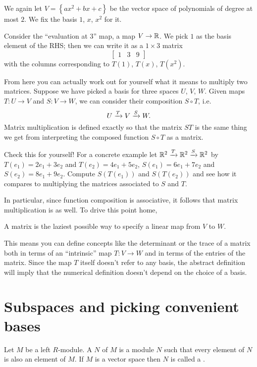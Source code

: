 \begin{example}
	We again let $V = \left\{ ax^2 + bx + c \right\}$
	be the vector space of polynomials of degree at most $2$.
	We fix the basis $1$, $x$, $x^2$ for it.

	Consider the ``evaluation at $3$'' map,
	a map $V \to \mathbb R$.
	We pick $1$ as the basis element of the RHS;
	then we can write it as a $1 \times 3$ matrix
	\[ \begin{bmatrix}
			1 & 3 & 9
		\end{bmatrix} \]
	with the columns corresponding to $T(1)$, $T(x)$, $T(x^2)$.
\end{example}


From here you can actually work out for yourself
what it means to multiply two matrices.
Suppose we have picked a basis for three spaces $U$, $V$, $W$.
Given maps $T \colon U \to V$ and $S \colon V \to W$,
we can consider their composition $S \circ T$, i.e.
\[ U \xrightarrow{T} V \xrightarrow{S} W. \]
Matrix multiplication is defined exactly so that the matrix $ST$
is the same thing we get from interpreting the composed function $S \circ T$ as a matrix.
\begin{exercise}
	Check this for yourself!
	For a concrete example let $\mathbb R^2 \xrightarrow{T} \mathbb R^2 \xrightarrow{S} \mathbb R^2$
	by $T(e_1) = 2e_1+3e_2$ and $T(e_2) = 4e_1+5e_2$,
	$S(e_1) = 6e_1+7e_2$ and $S(e_2) = 8e_1+9e_2$.
	Compute $S(T(e_1))$ and $S(T(e_2))$ and see how it compares
	to multiplying the matrices associated to $S$ and $T$.
\end{exercise}
In particular, since function composition is associative,
it follows that matrix multiplication is as well.
To drive this point home,
\begin{moral}
	A matrix is the laziest possible way to specify
	a linear map from $V$ to $W$.
\end{moral}

This means you can define concepts like the determinant or the trace of a matrix
both in terms of an ``intrinsic'' map $T \colon V \to W$
and in terms of the entries of the matrix.
Since the map $T$ itself doesn't refer to any basis,
the abstract definition will imply that the numerical definition
doesn't depend on the choice of a basis.

\section{Subspaces and picking convenient bases}
\begin{definition}
	Let $M$ be a left $R$-module.
	A  $N$ of $M$ is a module $N$
	such that every element of $N$ is also an element of $M$.
	If $M$ is a vector space then $N$ is called a .
\end{definition}


